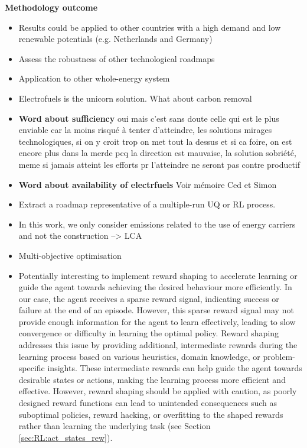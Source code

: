 \textbf{Methodology outcome}
\begin{itemize}
\item Results could be applied to other countries with a high demand and low renewable potentials (e.g. Netherlands and Germany)
\item Assess the robustness of other technological roadmaps
\item Application to other whole-energy system
\end{itemize}

\begin{itemize}
\item Electrofuels is the unicorn solution. What about carbon removal
\item \textbf{Word about sufficiency} oui mais c'est sans doute celle qui est le plus enviable car la moins risqué à tenter d'atteindre, les solutions mirages technologiques, si on y croit trop on met tout la dessus et si ca foire, on est encore plus dans la merde pcq la direction est mauvaise, la solution sobriété, meme si jamais atteint les efforts pr l'atteindre ne seront pas contre productif
\item \textbf{Word about availability of electrfuels} Voir mémoire Ced et Simon
\item Extract a roadmap representative of a multiple-run UQ or RL process.
\item In this work, we only consider emissions related to the use of energy carriers and not the construction --> LCA
\item Multi-objective optimisation
\item Potentially interesting to implement reward shaping to accelerate learning or guide the agent towards achieving the desired behaviour more efficiently. In our case, the agent receives a sparse reward signal, indicating success or failure at the end of an episode. However, this sparse reward signal may not provide enough information for the agent to learn effectively, leading to slow convergence or difficulty in learning the optimal policy. Reward shaping addresses this issue by providing additional, intermediate rewards during the learning process based on various heuristics, domain knowledge, or problem-specific insights. These intermediate rewards can help guide the agent towards desirable states or actions, making the learning process more efficient and effective. However, reward shaping should be applied with caution, as poorly designed reward functions can lead to unintended consequences such as suboptimal policies, reward hacking, or overfitting to the shaped rewards rather than learning the underlying task (see Section \ref{sec:RL:act_states_rew}).


\end{itemize}
